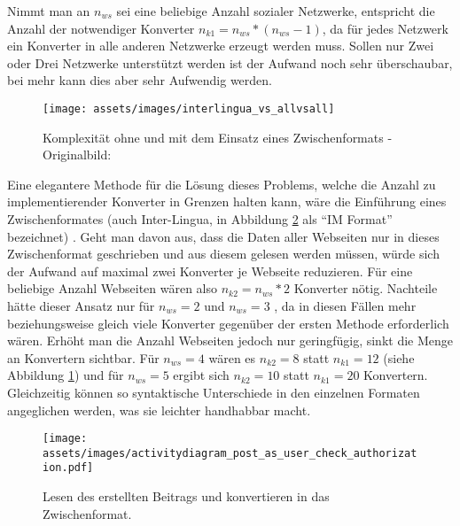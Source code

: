 Nimmt man an $n_{ws}$ sei eine beliebige Anzahl sozialer Netzwerke, entspricht die Anzahl der notwendiger Konverter $ n_{k1} = n_{ws}*(n_{ws}-1) $, da für jedes Netzwerk ein Konverter in alle anderen Netzwerke erzeugt werden muss. Sollen nur Zwei oder Drei Netzwerke unterstützt werden ist der Aufwand noch sehr überschaubar, bei mehr kann dies aber sehr Aufwendig werden. 

\begin{figure}[ht]
    \centering
    \texttt{[image: assets/images/interlingua\_vs\_allvsall]}
    \caption{Komplexität ohne und mit dem Einsatz eines Zwischenformats - Originalbild: \cite{Uschold1996a}}
    \label{fig:interlingua_vs_all}
\end{figure}

Eine elegantere Methode für die Lösung dieses Problems, welche die Anzahl zu implementierender Konverter in Grenzen halten kann, wäre die Einführung eines Zwischenformates (auch Inter-Lingua, in Abbildung \ref{fig:lesen_von_beitrag_und_convertieren} als \enquote{IM Format} bezeichnet) \cite[S.\,9]{Uschold1996a}. Geht man davon aus, dass die Daten aller Webseiten nur in dieses Zwischenformat geschrieben und aus diesem gelesen werden müssen, würde sich der Aufwand auf maximal zwei Konverter je Webseite reduzieren. Für eine beliebige Anzahl Webseiten wären also $ n_{k2} = n_{ws} * 2 $ Konverter nötig. Nachteile hätte dieser Ansatz nur für $ n_{ws} = 2 $ und $ n_{ws}=3$ , da in diesen Fällen mehr beziehungsweise gleich viele Konverter gegenüber der ersten Methode erforderlich wären. Erhöht man die Anzahl Webseiten jedoch nur geringfügig, sinkt die Menge an Konvertern sichtbar. Für $ n_{ws} = 4 $ wären es $ n_{k2} = 8 $ statt $ n_{k1} = 12 $ (siehe Abbildung \ref{fig:interlingua_vs_all}) und für $ n_{ws} = 5 $ ergibt sich $ n_{k2} = 10 $ statt $ n_{k1} = 20 $ Konvertern. Gleichzeitig können so syntaktische Unterschiede in den einzelnen Formaten angeglichen werden, was sie leichter handhabbar macht. 

\begin{figure}[ht]
    \texttt{[image: assets/images/activitydiagram\_post\_as\_user\_check\_authorization.pdf]}
    \caption{Lesen des erstellten Beitrags und konvertieren in das Zwischenformat.}
    \label{fig:lesen_von_beitrag_und_convertieren}
\end{figure}

